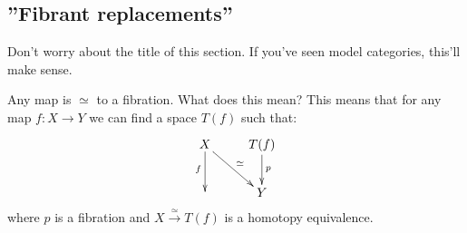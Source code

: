 \subsection{''Fibrant replacements''}
Don't worry about the title of this section. If you've seen model categories, this'll make sense.
\begin{theorem}
    Any map is $\simeq$ to a fibration. What does this mean? This means that for any map $f:X\to Y$ we can find a space $T(f)$ such that:
    \begin{equation*}
	\xymatrix{
	    X\ar[dr]^{\simeq}\ar[d]_f & T(f)\ar[d]^p\\
	    & Y
	    }
    \end{equation*}
    where $p$ is a fibration and $X\xrightarrow{\simeq} T(f)$ is a homotopy equivalence.
\end{theorem}
